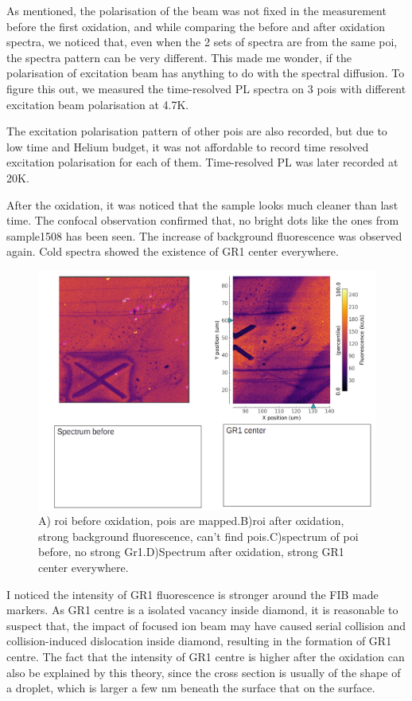 As mentioned, the polarisation of the beam was not fixed in the measurement before the first oxidation, and while comparing the before and after oxidation spectra, we noticed that, even when the 2 sets of spectra are from the same poi, the spectra pattern can be very different. This made me wonder, if the polarisation of excitation beam has anything to do with the spectral diffusion. To figure this out, we measured the time-resolved PL spectra on 3 pois with different excitation beam polarisation at 4.7K.

The excitation polarisation pattern of other pois are also recorded, but due to low time and Helium budget, it was not affordable to record time resolved excitation polarisation for each of them. Time-resolved PL was later recorded at 20K.

After the oxidation, it was noticed that the sample looks much cleaner than last time. The confocal observation confirmed that, no bright dots like the ones from sample1508 has been seen. The increase of background fluorescence was observed again. Cold spectra showed the existence of GR1 center everywhere.

\begin{figure}[h]
\centering
\includegraphics[width=0.7\linewidth]{Figures/pic/afteroxidation2}
\caption{A) roi before oxidation, pois are mapped.B)roi after oxidation, strong background fluorescence, can't find pois.C)spectrum of poi before, no strong Gr1.D)Spectrum after oxidation, strong GR1 center everywhere.}
\label{fig:wp20160921204221proli}
\end{figure}

I noticed the intensity of GR1 fluorescence is stronger around the FIB made markers. As GR1 centre is a isolated vacancy inside diamond, it is reasonable to suspect that, the impact of focused ion beam may have caused serial collision and collision-induced dislocation inside diamond, resulting in the formation of GR1 centre. The fact that the intensity of GR1 centre is higher after the oxidation can also be explained by this theory, since the cross section is usually of the shape of a droplet, which is larger a few nm beneath the surface that on the surface.

